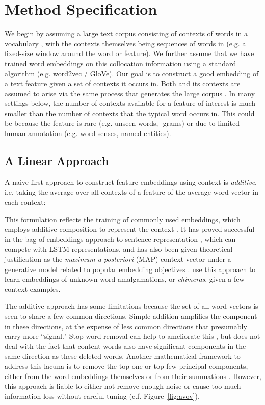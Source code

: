 \documentclass[11pt,a4paper]{article}
\begin{document}
\section{Method Specification}\label{sec:specification}

We begin by assuming a large text corpus  consisting of contexts  of words  in a vocabulary , with the contexts themselves being sequences of words in  (e.g. a fixed-size window around the word or feature).
We further assume that we have trained word embeddings  on this collocation information using a standard algorithm (e.g. word2vec / GloVe).
Our goal is to construct a good embedding  of a text feature  given a set  of contexts it occurs in.
Both  and its contexts are assumed to arise via the same process that generates the large corpus .
In many settings below, the number  of contexts available for a feature  of interest is much smaller than the number  of contexts that the typical word  occurs in.
This could be because the feature is rare (e.g. unseen words, -grams) or due to limited human annotation (e.g. word senses, named entities).

\subsection{A Linear Approach}\label{subsec:approach}

A naive first approach to construct feature embeddings using context is {\em additive}, i.e. taking the average over all contexts of a feature  of the average word vector in each context:

This formulation reflects the training of commonly used embeddings, which employs additive composition to represent the context \cite{Mikolov:13,Pennington:14}. 
It has proved successful in the bag-of-embeddings approach to sentence representation \cite{Wieting:16,Arora:17}, which can compete with LSTM representations, and has also been given theoretical justification as the {\em maximum a posteriori} (MAP) context vector under a generative model related to popular embedding objectives \cite{Arora:16}.
\citet{Lazaridou:17} use this approach to learn embeddings of unknown word amalgamations, or {\em chimeras}, given a few context examples.

The additive approach has some limitations because the set of all word vectors is seen to share a few common directions. 
Simple addition amplifies the component in these directions, at the expense of less common directions that presumably carry more ``signal."
Stop-word removal can help to ameliorate this \cite{Lazaridou:17,Herbelot:17}, but does not deal with the fact that content-words also have significant components in the same direction as these deleted words.
Another mathematical framework to address this lacuna is to remove the top one or top few principal components, either from the word embeddings themselves \cite{Mu:18} or from their summations \cite{Arora:17}.
However, this approach is liable to either not remove enough noise or cause too much information loss without careful tuning (c.f. Figure~\ref{fig:avov}).
\end{document}
